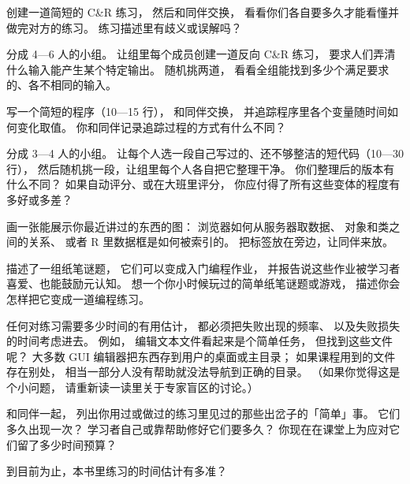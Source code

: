

创建一道简短的 C\&R 练习，
然后和同伴交换，
看看你们各自要多久才能看懂并做完对方的练习。
练习描述里有歧义或误解吗？


分成 4—6 人的小组。
让组里每个成员创建一道反向 C\&R 练习，
要求人们弄清什么输入能产生某个特定输出。
随机挑两道，
看看全组能找到多少个满足要求的、各不相同的输入。


写一个简短的程序（10—15 行），
和同伴交换，
并追踪程序里各个变量随时间如何变化取值。
你和同伴记录追踪过程的方式有什么不同？


分成 3—4 人的小组。
让每个人选一段自己写过的、还不够整洁的短代码（10—30 行），
然后随机挑一段，让组里每个人各自把它整理干净。
你们整理后的版本有什么不同？
如果自动评分、或在大班里评分，
你应付得了所有这些变体的程度有多好或多差？


画一张能展示你最近讲过的东西的图：
浏览器如何从服务器取数据、
对象和类之间的关系、
或者 R 里数据框是如何被索引的。
把标签放在旁边，让同伴来放。


\cite{Butl2017}描述了一组纸笔谜题，
它们可以变成入门编程作业，
并报告说这些作业被学习者喜爱、也能鼓励元认知。
想一个你小时候玩过的简单纸笔谜题或游戏，
描述你会怎样把它变成一道编程练习。


任何对练习需要多少时间的有用估计，
都必须把失败出现的频率、
以及失败损失的时间考虑进去。
例如，
编辑文本文件看起来是个简单任务，
但找到这些文件呢？
大多数 GUI 编辑器把东西存到用户的桌面或主目录；
如果课程用到的文件存在别处，
相当一部分人没有帮助就没法导航到正确的目录。
（如果你觉得这是个小问题，
请重新读一读里关于专家盲区的讨论。）

和同伴一起，
列出你用过或做过的练习里见过的那些出岔子的「简单」事。
它们多久出现一次？
学习者自己或靠帮助修好它们要多久？
你现在在课堂上为应对它们留了多少时间预算？


到目前为止，本书里练习的时间估计有多准？
